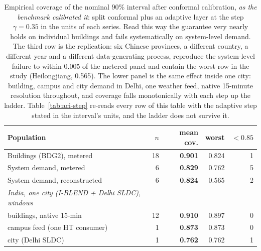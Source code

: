 \begin{table}[t]
\centering
\footnotesize
\setlength{\tabcolsep}{3pt}
\begin{tabular}{lrrrr}
\toprule
Population & $n$ & mean cov. & worst & $<0.85$ \\
\midrule
Buildings (BDG2), metered & 18 & \textbf{0.901} & 0.824 & 1 \\
System demand, metered & 6 & \textbf{0.829} & 0.762 & 5 \\
System demand, reconstructed & 6 & \textbf{0.824} & 0.565 & 2 \\
\midrule
\emph{India, one city (I-BLEND + Delhi SLDC), windows} &  &  &  &  \\
\quad buildings, native 15-min & 12 & \textbf{0.910} & 0.897 & 0 \\
\quad campus feed (one HT consumer) & 1 & \textbf{0.873} & 0.873 & 0 \\
\quad city (Delhi SLDC) & 1 & \textbf{0.762} & 0.762 & 1 \\
\bottomrule
\end{tabular}
\caption{Empirical coverage of the nominal 90\% interval after conformal calibration, \emph{as the benchmark calibrated it}: split conformal plus an adaptive layer at the step $\gamma=0.35$ in the units of each series. Read this way the guarantee very nearly holds on individual buildings and fails systematically on system-level demand. The third row is the replication: six Chinese provinces, a different country, a different year and a different data-generating process, reproduce the system-level failure to within 0.005 of the metered panel and contain the worst row in the study (Heilongjiang, 0.565). The lower panel is the same effect inside one city: building, campus and city demand in Delhi, one weather feed, native 15-minute resolution throughout, and coverage falls monotonically with each step up the ladder. Table~\ref{tab:aci-step} re-reads every row of this table with the adaptive step stated in the interval's units, and the ladder does not survive it.}
\label{tab:calibration}
\end{table}
